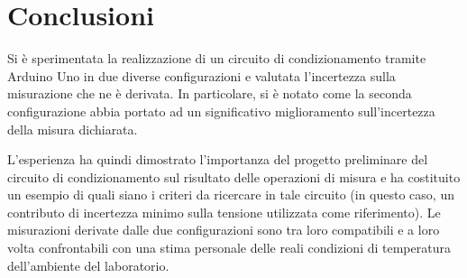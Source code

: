 \documentclass{article}
\begin{document}
\section{Conclusioni}
Si è sperimentata la realizzazione di un circuito di condizionamento tramite Arduino Uno in due diverse configurazioni e valutata l'incertezza sulla misurazione che ne è derivata. In particolare, si è notato come la seconda configurazione abbia portato ad un significativo miglioramento sull'incertezza della misura dichiarata. 

L'esperienza ha quindi dimostrato l'importanza del progetto preliminare del circuito di condizionamento sul risultato delle operazioni di misura
e ha costituito un esempio di quali siano i criteri da ricercare in tale circuito (in questo caso, un contributo di incertezza minimo sulla tensione utilizzata come riferimento).
Le misurazioni derivate dalle due configurazioni sono tra loro compatibili e a loro volta confrontabili con una stima personale delle reali condizioni di temperatura dell'ambiente del laboratorio. 
\end{document}
